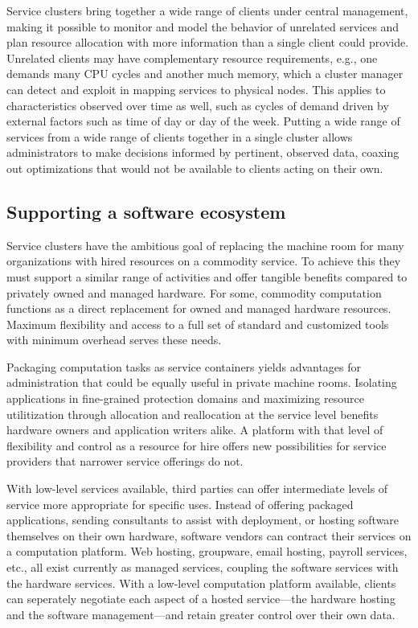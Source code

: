 Service clusters bring together a wide range of clients under central management, making it possible to monitor and model the behavior of unrelated services and plan resource allocation with more information than a single client could provide. Unrelated clients may have complementary resource requirements, e.g., one demands many CPU cycles and another much memory, which a cluster manager can detect and exploit in mapping services to physical nodes. This applies to characteristics observed over time as well, such as cycles of demand driven by external factors such as time of day or day of the week. Putting a wide range of services from a wide range of clients together in a single cluster allows administrators to make decisions informed by pertinent, observed data, coaxing out optimizations that would not be available to clients acting on their own.

\subsection{Supporting a software ecosystem}

Service clusters have the ambitious goal of replacing the machine room for many organizations with hired resources on a commodity service. To achieve this they must support a similar range of activities and offer tangible benefits compared to privately owned and managed hardware. For some, commodity computation functions as a direct replacement for owned and managed hardware resources. Maximum flexibility and access to a full set of standard and customized tools with minimum overhead serves these needs.

Packaging computation tasks as service containers yields advantages for administration that could be equally useful in private machine rooms. Isolating applications in fine-grained protection domains and maximizing resource utilitization through allocation and reallocation at the service level benefits hardware owners and application writers alike. A platform with that level of flexibility and control as a resource for hire offers new possibilities for service providers that narrower service offerings do not.

With low-level services available, third parties can offer intermediate levels of service more appropriate for specific uses. Instead of offering packaged applications, sending consultants to assist with deployment, or hosting software themselves on their own hardware, software vendors can contract their services on a computation platform. Web hosting, groupware, email hosting, payroll services, etc., all exist currently as managed services, coupling the software services with the hardware services. With a low-level computation platform available, clients can seperately negotiate each aspect of a hosted service---the hardware hosting and the software management---and retain greater control over their own data.

